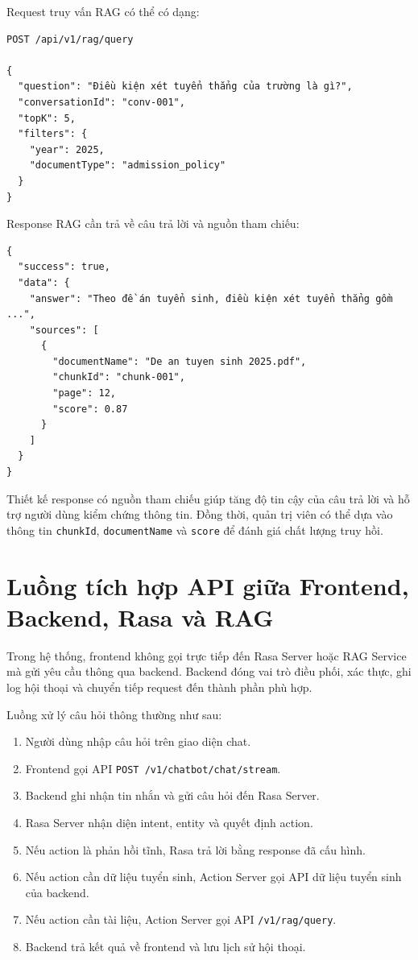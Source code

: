 Request truy vấn RAG có thể có dạng:

\begin{verbatim}
POST /api/v1/rag/query

{
  "question": "Điều kiện xét tuyển thẳng của trường là gì?",
  "conversationId": "conv-001",
  "topK": 5,
  "filters": {
    "year": 2025,
    "documentType": "admission_policy"
  }
}
\end{verbatim}

Response RAG cần trả về câu trả lời và nguồn tham chiếu:

\begin{verbatim}
{
  "success": true,
  "data": {
    "answer": "Theo đề án tuyển sinh, điều kiện xét tuyển thẳng gồm ...",
    "sources": [
      {
        "documentName": "De an tuyen sinh 2025.pdf",
        "chunkId": "chunk-001",
        "page": 12,
        "score": 0.87
      }
    ]
  }
}
\end{verbatim}

Thiết kế response có nguồn tham chiếu giúp tăng độ tin cậy của câu trả lời và hỗ trợ người dùng kiểm chứng thông tin. Đồng thời, quản trị viên có thể dựa vào thông tin \texttt{chunkId}, \texttt{documentName} và \texttt{score} để đánh giá chất lượng truy hồi.

\section{Luồng tích hợp API giữa Frontend, Backend, Rasa và RAG}

Trong hệ thống, frontend không gọi trực tiếp đến Rasa Server hoặc RAG Service mà gửi yêu cầu thông qua backend. Backend đóng vai trò điều phối, xác thực, ghi log hội thoại và chuyển tiếp request đến thành phần phù hợp.

Luồng xử lý câu hỏi thông thường như sau:

\begin{enumerate}
    \item Người dùng nhập câu hỏi trên giao diện chat.
    \item Frontend gọi API \texttt{POST /v1/chatbot/chat/stream}.
    \item Backend ghi nhận tin nhắn và gửi câu hỏi đến Rasa Server.
    \item Rasa Server nhận diện intent, entity và quyết định action.
    \item Nếu action là phản hồi tĩnh, Rasa trả lời bằng response đã cấu hình.
    \item Nếu action cần dữ liệu tuyển sinh, Action Server gọi API dữ liệu tuyển sinh của backend.
    \item Nếu action cần tài liệu, Action Server gọi API \texttt{/v1/rag/query}.
    \item Backend trả kết quả về frontend và lưu lịch sử hội thoại.
\end{enumerate}

